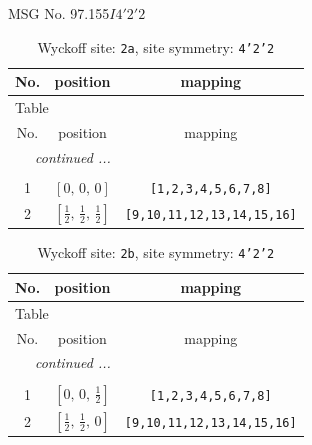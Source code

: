 \documentclass[fleqn,8pt]{jsarticle}
\begin{document}
\setcounter{MaxMatrixCols}{32}

\renewcommand{\tablename}{Table~}
\renewcommand{\figurename}{Figure~}
\begin{center}
\LARGE
MSG No. 97.155\quad$I4'2'2$
\end{center}
\renewcommand{\arraystretch}{1.2}
\begin{longtable}{ccc}
\caption{Wyckoff site: {\tt 2a}, site symmetry: {\tt 4'2'2}}
 \\
 \hline \hline
No. & position & mapping \\ \hline \endfirsthead

\multicolumn{2}{l}{\tablename\ \thetable{}} \\
 \hline \hline
No. & position & mapping \\ \hline \endhead

 \hline \hline
\multicolumn{2}{r}{\footnotesize\it continued ...} \\ \endfoot

 \hline \hline
\multicolumn{2}{r}{} \\ \endlastfoot

1 & $\left[ 0,\, 0,\, 0 \right]$ & {\tt [1,2,3,4,5,6,7,8]} \\ \hline
2 & $\left[ \frac{1}{2},\, \frac{1}{2},\, \frac{1}{2} \right]$ & {\tt [9,10,11,12,13,14,15,16]} \\
\end{longtable}
\renewcommand{\arraystretch}{1.2}
\begin{longtable}{ccc}
\caption{Wyckoff site: {\tt 2b}, site symmetry: {\tt 4'2'2}}
 \\
 \hline \hline
No. & position & mapping \\ \hline \endfirsthead

\multicolumn{2}{l}{\tablename\ \thetable{}} \\
 \hline \hline
No. & position & mapping \\ \hline \endhead

 \hline \hline
\multicolumn{2}{r}{\footnotesize\it continued ...} \\ \endfoot

 \hline \hline
\multicolumn{2}{r}{} \\ \endlastfoot

1 & $\left[ 0,\, 0,\, \frac{1}{2} \right]$ & {\tt [1,2,3,4,5,6,7,8]} \\ \hline
2 & $\left[ \frac{1}{2},\, \frac{1}{2},\, 0 \right]$ & {\tt [9,10,11,12,13,14,15,16]} \\
\end{longtable}
\end{document}
